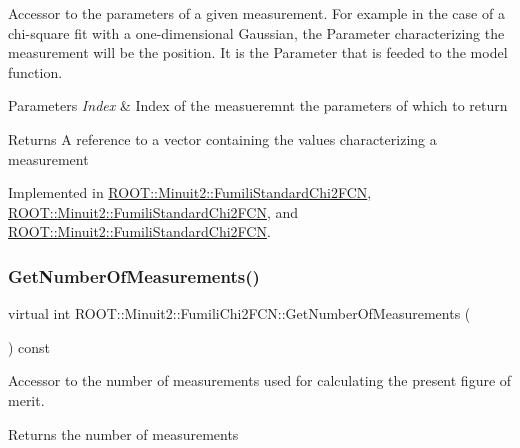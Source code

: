 Accessor to the parameters of a given measurement. For example in the case of a chi-\/square fit with a one-\/dimensional Gaussian, the Parameter characterizing the measurement will be the position. It is the Parameter that is feeded to the model function.


\begin{DoxyParams}{Parameters}
{\em Index} & Index of the measueremnt the parameters of which to return \\
\hline
\end{DoxyParams}
\begin{DoxyReturn}{Returns}
A reference to a vector containing the values characterizing a measurement 
\end{DoxyReturn}


Implemented in \mbox{\hyperlink{classROOT_1_1Minuit2_1_1FumiliStandardChi2FCN_aed6181ee2996e090bc4aeb267771390e}{R\+O\+O\+T\+::\+Minuit2\+::\+Fumili\+Standard\+Chi2\+F\+CN}}, \mbox{\hyperlink{classROOT_1_1Minuit2_1_1FumiliStandardChi2FCN_a3bbc9a9cb77ce45aa764aa1f6e74349c}{R\+O\+O\+T\+::\+Minuit2\+::\+Fumili\+Standard\+Chi2\+F\+CN}}, and \mbox{\hyperlink{classROOT_1_1Minuit2_1_1FumiliStandardChi2FCN_a3bbc9a9cb77ce45aa764aa1f6e74349c}{R\+O\+O\+T\+::\+Minuit2\+::\+Fumili\+Standard\+Chi2\+F\+CN}}.

\mbox{\label{classROOT_1_1Minuit2_1_1FumiliChi2FCN_afa1acb8484d1c1825de0dd641e301717}} 
\subsubsection{\texorpdfstring{GetNumberOfMeasurements()}{GetNumberOfMeasurements()}\hspace{0.1cm}{\footnotesize\ttfamily [1/3]}}
{\footnotesize\ttfamily virtual int R\+O\+O\+T\+::\+Minuit2\+::\+Fumili\+Chi2\+F\+C\+N\+::\+Get\+Number\+Of\+Measurements (\begin{DoxyParamCaption}{ }\end{DoxyParamCaption}) const\hspace{0.3cm}{\ttfamily [pure virtual]}}

Accessor to the number of measurements used for calculating the present figure of merit.

\begin{DoxyReturn}{Returns}
the number of measurements 
\end{DoxyReturn}



